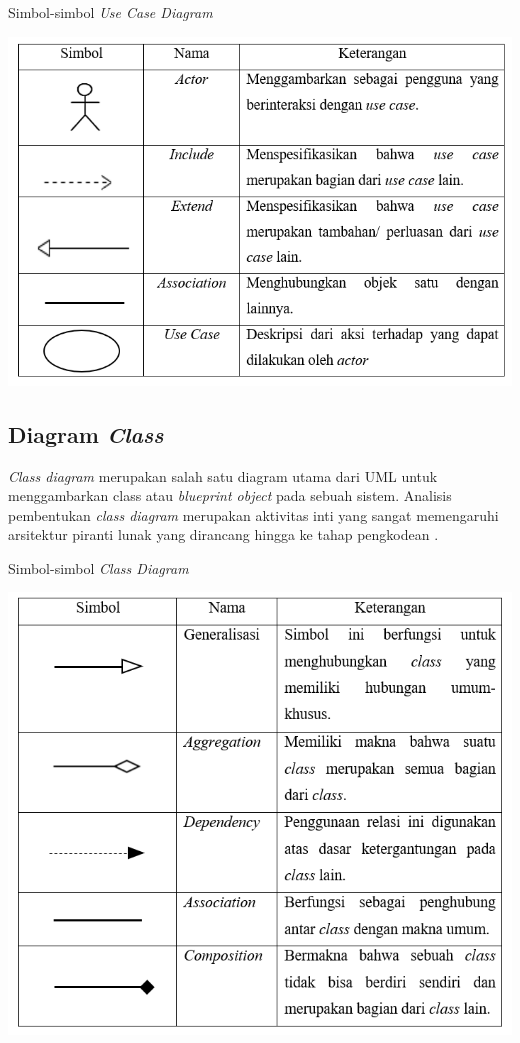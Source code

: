\begin{table}[H]
	\centering
	\caption{Simbol-simbol \emph{Use Case Diagram}}
	\includegraphics[width=1.0\textwidth]{gambar/simbolusecase}
	\label{tabel_karaktermax2}
\end{table}

\subsection{Diagram \emph{Class}} 

\emph{Class diagram} merupakan salah satu diagram utama dari UML untuk menggambarkan class atau \emph{blueprint object} pada sebuah sistem. Analisis pembentukan \emph{class diagram} merupakan aktivitas inti yang sangat memengaruhi arsitektur piranti lunak yang dirancang hingga ke tahap pengkodean \cite{tanuwijaya}.

\begin{table}[H]
	\centering
	\caption{Simbol-simbol \emph{Class Diagram}}
	\includegraphics[width=1.0\textwidth]{gambar/simbolclass}
	\label{tabel_karaktermax2}
\end{table}

